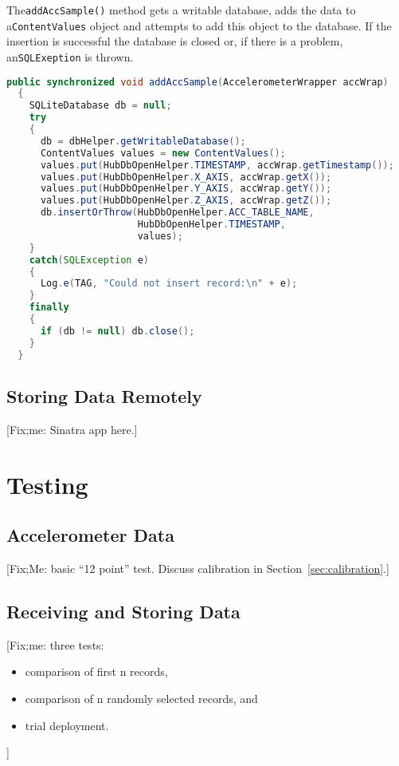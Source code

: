\documentclass[11pt, a4paper, oneside, english]{scrbook}
\begin{document}
The\lstinline{addAccSample()} method gets a writable database, adds the data to a\lstinline{ContentValues} object and attempts to add this object to the database. If the insertion is successful the database is closed or, if there is a problem, an\lstinline{SQLExeption} is thrown.
\begin{lstlisting}[language=Java, numbers=none]
  public synchronized void addAccSample(AccelerometerWrapper accWrap)
  {
    SQLiteDatabase db = null;
    try
    {
      db = dbHelper.getWritableDatabase();
      ContentValues values = new ContentValues();
      values.put(HubDbOpenHelper.TIMESTAMP, accWrap.getTimestamp());
      values.put(HubDbOpenHelper.X_AXIS, accWrap.getX());
      values.put(HubDbOpenHelper.Y_AXIS, accWrap.getY());
      values.put(HubDbOpenHelper.Z_AXIS, accWrap.getZ());
      db.insertOrThrow(HubDbOpenHelper.ACC_TABLE_NAME,
                       HubDbOpenHelper.TIMESTAMP,
                       values);
    }
    catch(SQLException e)
    {
      Log.e(TAG, "Could not insert record:\n" + e);
    }
    finally
    {
      if (db != null) db.close();
    }
  }
\end{lstlisting}
\section{Storing Data Remotely} %
\label{sec:storing_data_remotely}
[Fix;me: Sinatra app here.]
\chapter{Testing} %
\label{cha:testing}
\section{Accelerometer Data} %
\label{sec:accelerometer_data}
[Fix;Me: basic ``12 point'' test. Discuss calibration in Section~\ref{sec:calibration}.]
\section{Receiving and Storing Data} %
\label{sec:receiving_data}
[Fix;me: three tests:
\begin{itemize}
  \item comparison of first n records,
  \item comparison of n randomly selected records, and
  \item trial deployment.
\end{itemize}
]
\end{document}
